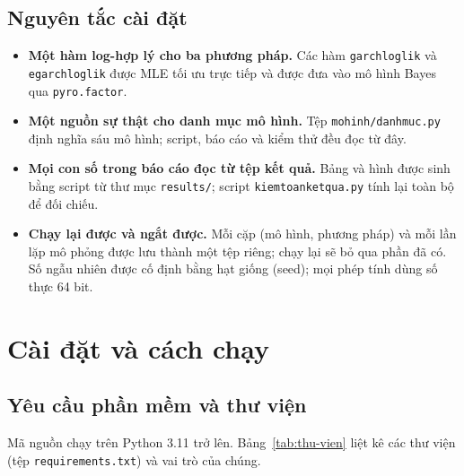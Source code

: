\documentclass[11pt,a4paper]{article}
\renewcommand{\_}{\gachduoi\allowbreak}
\newcommand{\tep}[1]{\texttt{#1}}
\newcommand{\ham}[1]{\texttt{#1}}
\begin{document}
\subsection{Nguyên tắc cài đặt}
\begin{itemize}
\item \textbf{Một hàm log-hợp lý cho ba phương pháp.} Các hàm \ham{garch\_loglik} và \ham{egarch\_loglik} được MLE tối ưu trực tiếp và được đưa vào mô hình Bayes qua \ham{pyro.factor}.
\item \textbf{Một nguồn sự thật cho danh mục mô hình.} Tệp \tep{mo\_hinh/danh\_muc.py} định nghĩa sáu mô hình; script, báo cáo và kiểm thử đều đọc từ đây.
\item \textbf{Mọi con số trong báo cáo đọc từ tệp kết quả.} Bảng và hình được sinh bằng script từ thư mục \tep{results/}; script \tep{kiem\_toan\_ket\_qua.py} tính lại toàn bộ để đối chiếu.
\item \textbf{Chạy lại được và ngắt được.} Mỗi cặp (mô hình, phương pháp) và mỗi lần lặp mô phỏng được lưu thành một tệp riêng; chạy lại sẽ bỏ qua phần đã có. Số ngẫu nhiên được cố định bằng hạt giống (seed); mọi phép tính dùng số thực 64 bit.
\end{itemize}

\section{Cài đặt và cách chạy}
\subsection{Yêu cầu phần mềm và thư viện}
Mã nguồn chạy trên Python 3.11 trở lên. Bảng~\ref{tab:thu-vien} liệt kê các thư viện (tệp \tep{requirements.txt}) và vai trò của chúng.
\end{document}
